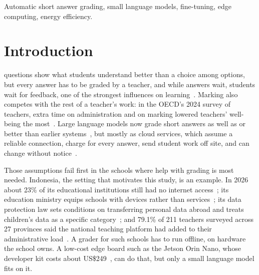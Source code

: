\documentclass[journal]{IEEEtran}
\begin{document}
\begin{IEEEkeywords}
Automatic short answer grading, small language models, fine-tuning, edge computing, energy efficiency.
\end{IEEEkeywords}

\section{Introduction}
\label{sec:intro}
 questions show what students understand better than a choice among options, but every answer has to be graded by a teacher, and while answers wait, students wait for feedback, one of the strongest influences on learning~\cite{hattie2007feedback}.
Marking also competes with the rest of a teacher's work: in the OECD's 2024 survey of teachers, extra time on administration and on marking lowered teachers' well-being the most~\cite{oecd2025talis}.
Large language models now grade short answers as well as or better than earlier systems~\cite{wang2024rag,funayama2025crossprompt}, but mostly as cloud services, which assume a reliable connection, charge for every answer, send student work off site, and can change without notice~\cite{chen2024drift}.

Those assumptions fail first in the schools where help with grading is most needed.
Indonesia, the setting that motivates this study, is an example.
In 2026 about 23\% of its educational institutions still had no internet access~\cite{antara2026internet}; its education ministry equips schools with devices rather than services~\cite{antara2026panels}; its data protection law sets conditions on transferring personal data abroad and treats children's data as a specific category~\cite{uupdp2022}; and 79.1\% of 211 teachers surveyed across 27 provinces said the national teaching platform had added to their administrative load~\cite{haeri2024pmm}.
A grader for such schools has to run offline, on hardware the school owns.
A low-cost edge board such as the Jetson Orin Nano, whose developer kit costs about US\$249~\cite{siliconangle2024orinnano}, can do that, but only a small language model fits on it.
\end{document}
